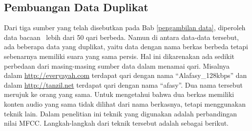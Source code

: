   \subsection{Pembuangan Data Duplikat}
  Dari tiga sumber yang telah disebutkan pada Bab \ref{pengambilan data}, diperoleh data bacaan \quran~lebih dari 50 qari berbeda. Namun di antara data-data tersebut, ada beberapa data yang duplikat, yaitu data dengan nama berkas berbeda tetapi sebenarnya memiliki suara yang sama persis. Hal ini dikarenakan ada sedikit perbedaan dari masing-masing sumber data dalam menamai qari. Misalnya dalam \url{http://everyayah.com} terdapat qari dengan nama ``Alafasy\_128kbps'' dan dalam \url{http://tanzil.net} terdapat qari dengan nama ``afasy''. Dua nama tersebut merujuk ke orang yang sama. Untuk mengetahui bahwa dua berkas memiliki konten audio yang sama tidak dilihat dari nama berkasnya, tetapi menggunakan teknik lain. Dalam penelitian ini teknik yang digunakan adalah perbandingan nilai MFCC. Langkah-langkah dari teknik tersebut adalah sebagai berikut.

